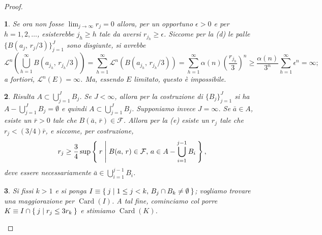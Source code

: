 \documentclass[a4paper,10pt,openright,oneside]{book}
\theoremstyle{theoremstyle}
\theoremstyle{theoremstylewoheader}
\theoremstyle{theoremstyle}
\theoremstyle{proofsecstyle}
\newtheorem{proofsec}{}
\theoremstyle{nonumberplain}
\newtheorem{proof}{Dim.}
\newcommand{\FF}{\ensuremath{\mathcal{F}}}
\newcommand{\Leb}{\ensuremath{\mathcal{L}}}
\DeclareMathOperator{\Card}{Card}
\begin{document}
\begin{proof}
\begin{proofsec}
Se ora non fosse $\lim_{j \to \infty} r_j = 0$ allora, per un opportuno $\epsilon > 0$ e per $h = 1, 2, \ldots$, esisterebbe $j_h \ge h$ tale da aversi $r_{j_h} \ge \epsilon$. Siccome per la (d) le palle $\{B(a_j,\, r_j/3)\}_{j=1}^J$ sono disgiunte, si avrebbe
\[
\Leb^n\left(\bigcup_{h=1}^\infty B(a_{j_h},\, r_{j_h}/3)\right) = \sum_{h=1}^\infty \Leb^n(B(a_{j_h},\, r_{j_h}/3)) = \sum_{h=1}^\infty \alpha(n) \left(\frac{r_{j_h}}{3}\right)^n \ge \frac{\alpha(n)}{3^n} \sum_{h=1}^\infty \epsilon^n = \infty;
\]
\emph{a fortiori}, $\Leb^n(E) = \infty$. Ma, essendo $E$ limitato, questo è impossibile.
\end{proofsec}

\begin{proofsec}
\emph{Risulta $A \subset \bigcup_{j=1}^J B_j$.}\hspace{.5em} Se $J < \infty$, allora per la costruzione di $\{B_j\}_{j=1}^J$ si ha $A - \bigcup_{j=1}^J B_j = \emptyset$ e quindi $A \subset \bigcup_{j=1}^J B_j$. Supponiamo invece $J = \infty$. Se $\bar{a} \in A$, esiste un $\bar{r} > 0$ tale che $B(\bar{a},\, \bar{r}) \in \FF$. Allora per la (e) esiste un $r_j$ tale che $r_j < (3/4)\bar{r}$, e siccome, per costruzione,
\[
r_j \ge \frac{3}{4} \sup\Set{ r | B(a,\, r) \in \FF,\, a \in A - \bigcup_{i=1}^{j-1} B_i },
\]
deve essere necessariamente $\bar{a} \in \bigcup_{i=1}^{j-1} B_i$.
\end{proofsec}

\begin{proofsec}
Si fissi $k > 1$ e si ponga $I \equiv \Set{ j | 1 \le j < k,\, B_j \cap B_k \ne \emptyset }$; vogliamo trovare una maggiorazione per $\Card(I)$. A tal fine, cominciamo col porre $K \equiv I \cap \Set{ j | r_j \le 3r_k }$ e stimiamo $\Card(K)$.
\end{proofsec}


\end{proof}
\end{document}
